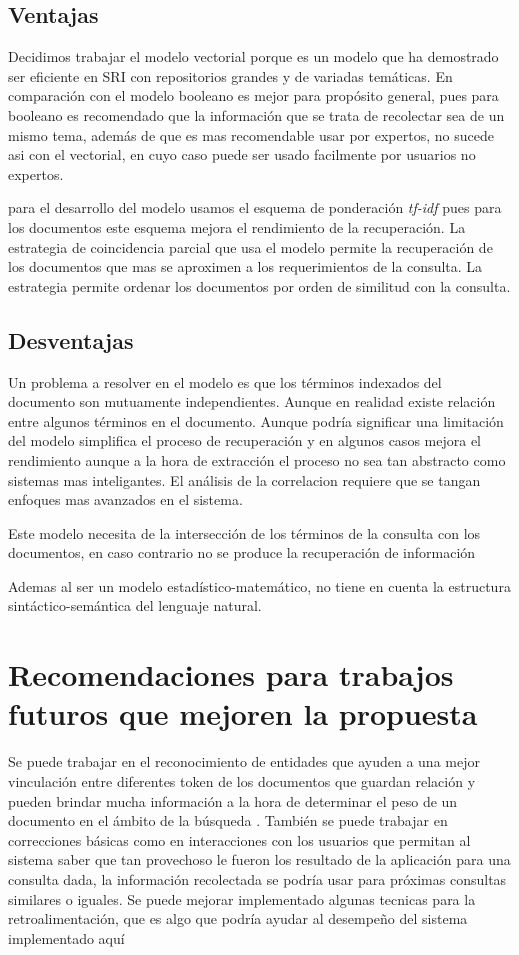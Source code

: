 \documentclass{llncs}
\begin{document}
	
	\subsection{Ventajas}
	Decidimos trabajar el modelo vectorial porque es un modelo que ha demostrado ser eficiente en SRI con repositorios grandes y de variadas tem\'aticas. En comparaci\'on con el modelo booleano es mejor para prop\'osito general, pues para booleano es recomendado que la informaci\'on que se trata de recolectar sea de un mismo tema, adem\'as de que es mas recomendable usar por expertos, no sucede asi con el vectorial, en cuyo caso puede ser usado facilmente por usuarios no expertos.
	
	para el desarrollo del modelo usamos el esquema de ponderaci\'on \textit{tf-idf} pues para los documentos este esquema mejora el rendimiento de la recuperaci\'on. La estrategia de coincidencia parcial que usa el modelo permite la recuperaci\'on de los documentos que mas se aproximen a los requerimientos de la consulta. La estrategia permite ordenar los documentos por orden de similitud con la consulta.
	
	\subsection{Desventajas}
	Un problema a resolver en el modelo es que  los t\'erminos indexados del documento son mutuamente independientes. Aunque en realidad existe relaci\'on entre algunos t\'erminos en el documento. Aunque podr\'ia significar una limitaci\'on del modelo simplifica el proceso de recuperaci\'on y en algunos casos mejora el rendimiento aunque a la hora de extracci\'on el proceso no sea tan abstracto como sistemas mas inteligantes. El an\'alisis de la correlacion requiere que se tangan enfoques mas avanzados en el sistema.
	
	Este modelo necesita de la intersecci\'on de los t\'erminos de la consulta con los documentos, en caso contrario no se produce la recuperaci\'on de informaci\'on
	
	Ademas al ser un modelo estad\'istico-matem\'atico, no tiene en cuenta la estructura sintáctico-semántica del lenguaje natural.
	
	\section{Recomendaciones para trabajos futuros que mejoren la propuesta}
	
	 Se puede trabajar en el reconocimiento de entidades que ayuden a una mejor vinculaci\'on entre diferentes token de los documentos que guardan relaci\'on y pueden brindar mucha informaci\'on a la hora de determinar el peso de un documento en el \'ambito de la b\'usqueda . Tambi\'en se puede trabajar en correcciones b\'asicas como en interacciones con los usuarios que permitan al sistema saber que tan provechoso le fueron los resultado de la aplicaci\'on para una consulta dada, la informaci\'on recolectada se podr\'ia usar para pr\'oximas consultas similares o iguales. Se puede mejorar implementado algunas tecnicas para la retroalimentaci\'on, que es algo que podr\'ia ayudar al desempe\~no del sistema implementado aqu\'i 
	
\end{document}
